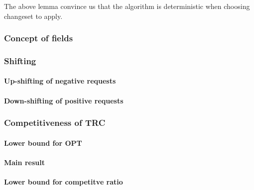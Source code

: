 The above lemma convince us that the algorithm is deterministic when choosing 
changeset to apply.

\subsubsection{Concept of fields}

\subsubsection{Shifting}
\paragraph{Up-shifting of negative requests}
\paragraph{Down-shifting of positive requests}

\subsubsection{Competitiveness of TRC}
\paragraph{Lower bound for OPT}
\paragraph{Main result}
\paragraph{Lower bound for competitve ratio}
